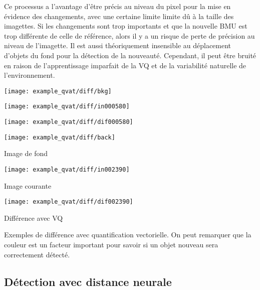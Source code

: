 	Ce processus a l'avantage d'être précis au niveau du pixel pour la mise en évidence des changements, avec une certaine limite limite dû à la taille des imagettes. Si les changements sont trop importants et que la nouvelle BMU est trop différente de celle de référence, alors il y a un risque de perte de précision au niveau de l'imagette. Il est aussi théoriquement insensible au déplacement d'objets du fond pour la détection de la nouveauté. Cependant, il peut être bruité en raison de l'apprentissage imparfait de la VQ et de la variabilité naturelle de l'environnement.

	\begin{figureth}
		\begin{subfigureth}{.32\textwidth}
			\texttt{[image: example\_qvat/diff/bkg]}
		\end{subfigureth}
		\begin{subfigureth}{.32\textwidth}
			\texttt{[image: example\_qvat/diff/in000580]}
		\end{subfigureth}
		\begin{subfigureth}{.32\textwidth}
			\texttt{[image: example\_qvat/diff/dif000580]}
		\end{subfigureth}

		\begin{subfigureth}{.32\textwidth}
			\texttt{[image: example\_qvat/diff/back]} \caption{Image de fond}
		\end{subfigureth}
		\begin{subfigureth}{.32\textwidth}
			\texttt{[image: example\_qvat/diff/in002390]} \caption{Image courante}
		\end{subfigureth}
		\begin{subfigureth}{.32\textwidth}
			\texttt{[image: example\_qvat/diff/dif002390]} \caption{Différence avec VQ}
		\end{subfigureth}

		\caption[Exemples de différence avec quantification vectorielle]{Exemples de différence avec quantification vectorielle. On peut remarquer que la couleur est un facteur important pour savoir si un objet nouveau sera correctement détecté.}\label{fig:visu-vq}
	\end{figureth}

	\subsection{Détection avec distance neurale}

